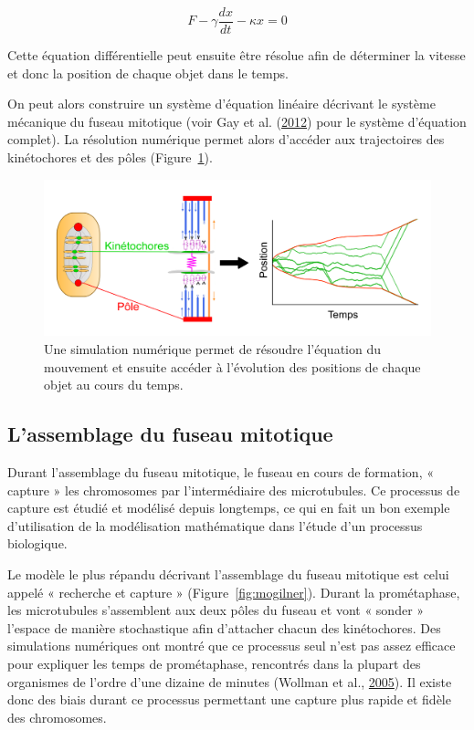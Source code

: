 \documentclass[12pt,a4paper,twoside,openright]{book}
\begin{document}
\[
F - \gamma\frac{dx}{dt} - \kappa x = 0
\]

Cette équation différentielle peut ensuite être résolue afin de
déterminer la vitesse et donc la position de chaque objet dans le temps.

On peut alors construire un système d'équation linéaire décrivant le
système mécanique du fuseau mitotique (voir Gay et al.
(\hyperref[ref-Gay2012a]{2012}) pour le système d'équation complet). La
résolution numérique permet alors d'accéder aux trajectoires des
kinétochores et des pôles (Figure~\ref{fig:traj_model}).

\begin{figure}[htbp]
\centering
\includegraphics{figures/intro/traj_model.png}
\caption[Trajectoire des chromosomes \_in silico\_]{\label{fig:traj_model}Une
simulation numérique permet de résoudre l'équation du mouvement et
ensuite accéder à l'évolution des positions de chaque objet au cours du
temps.}
\end{figure}

\subsection{L'assemblage du fuseau
mitotique}\label{lassemblage-du-fuseau-mitotique}

Durant l'assemblage du fuseau mitotique, le fuseau en cours de
formation, « capture » les chromosomes par l'intermédiaire des
microtubules. Ce processus de capture est étudié et modélisé depuis
longtemps, ce qui en fait un bon exemple d'utilisation de la
modélisation mathématique dans l'étude d'un processus biologique.

Le modèle le plus répandu décrivant l'assemblage du fuseau mitotique est
celui appelé « recherche et capture » (Figure~\ref{fig:mogilner}).
Durant la prométaphase, les microtubules s'assemblent aux deux pôles du
fuseau et vont « sonder » l'espace de manière stochastique afin
d'attacher chacun des kinétochores. Des simulations numériques ont
montré que ce processus seul n'est pas assez efficace pour expliquer les
temps de prométaphase, rencontrés dans la plupart des organismes de
l'ordre d'une dizaine de minutes (Wollman et al.,
\hyperref[ref-Wollman2005]{2005}). Il existe donc des biais durant ce
processus permettant une capture plus rapide et fidèle des chromosomes.
\end{document}
